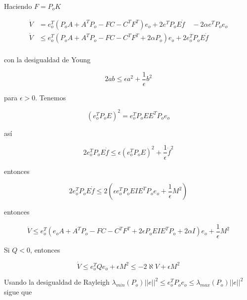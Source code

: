 \begin{flushright}
\end{flushright}

Haciendo \(F=P_oK\)

\begin{equation*}
    \begin{aligned}
        \dot{V}&=e^T_o(P_oA+A^TP_o-FC-C^TF^T)e_o + 2e^TP_oE\dot{f} \quad -2\alpha e^TP_oe_o\\
        \dot{V}&\leq e^T_o(P_oA+A^TP_o-FC-C^TF^T+2\alpha P_o)e_o + 2 e^T_oP_oE\dot{f}\\
    \end{aligned}
\end{equation*}

con la desigualdad de Young

\begin{equation*}
    2ab\leq \epsilon a^2 + \frac{1}{\epsilon}b^2
\end{equation*}

para \(\epsilon>0\). Tenemos

\begin{equation*}
    (e_o^TP_oE)^2=e_o^TP_oEE^TP_oe_o
\end{equation*}

así

\begin{equation*}
    2e_o^TP_oE\dot{f}\leq \epsilon(e_o^TP_oE)^2 + \frac{1}{\epsilon}\dot{f}^2
\end{equation*}

entonces

\begin{equation*}
    2e_o^TP_oE\dot{f}\leq 2(\epsilon e_o^TP_oEIE^TP_oe_o + \frac{1}{\epsilon}M^2)
\end{equation*}

entonces

\begin{equation*}
    \dot{V} \leq  e_o^T(e_oA+ A^TP_o-FC-C^TF^T+2\epsilon P_oEIE^TP_o+2\alpha I)e_o + \frac{1}{\epsilon}M^2
\end{equation*}

Si \(Q<0\), entonces

\begin{equation*}
    \dot{V} \leq  e_o^T Q e_o + \epsilon M^2 \leq  -2\aleph V+ \epsilon M^2
\end{equation*}

Usando la desigualdad de Rayleigh \(\lambda_{min}(P_o)||e||^2 \leq  e_o^TP_oe_o \leq  \lambda_{max}(P_o)||e||^2\) sigue que

